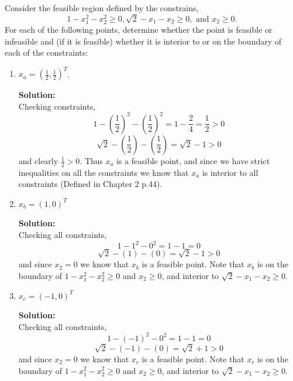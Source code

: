 \documentclass[12pt]{article}
\makeatletter
\theoremstyle{homework}
\newenvironment{exercise}[1]
{\def\@currentlabel{#1}\exercisecore}
{\endexercisecore}
\newcommand{\localhead}[1]{\par\smallskip\noindent\textbf{#1}\nobreak\\}%
\newcommand\solution{\localhead{Solution:}}
\makeatother
\begin{document}
\begin{exercise}{2.1} Consider the feasible region defined by the constrains, 
  \begin{equation*}
    1 - x_1^2 - x_2^2 \geq 0, \sqrt{2} - x_1 - x_2 \geq 0,\text{ and } x_2 \geq 0. 
  \end{equation*}
  For each of the following points, determine whether the point is feasible or infeasible and (if it is feasible)
  whether it is interior to or on the boundary of each of the constraints:
  \begin{enumerate}
    \item $x_a = (\frac{1}{2}, \frac{1}{2})^{T}$.
    \solution Checking constraints, 
    \begin{equation*}
      1 - \left(\frac{1}{2}\right)^2 - \left(\frac{1}{2}\right)^2 = 1 - \frac{2}{4} = \frac{1}{2} > 0
    \end{equation*}
    \begin{equation*}
      \sqrt{2} - (\frac{1}{2}) - (\frac{1}{2}) = \sqrt{2} - 1 > 0
    \end{equation*}
    and clearly $\frac{1}{2} > 0$. Thus $x_a$ is a feasible point, and since we have strict inequalities
    on all the constraints we know that $x_a$ is interior to all constraints (Defined in Chapter 2 p.44). 
    
    \item $x_b = (1,0)^T$
    \solution Checking all constraints, 
    \begin{equation*}
      1 - 1^2 - 0^2 = 1 - 1 =  0
    \end{equation*}
    \begin{equation*}
      \sqrt{2} - (1) - (0) = \sqrt{2} - 1 > 0
    \end{equation*}
    and since $x_2 = 0$ we know that $x_b$ is a feasible point. Note that $x_b$ is on the boundary of 
    $1 - x_1^2 - x_2^2 \geq 0$ and $x_2 \geq 0$, and interior to $\sqrt{2} - x_1 - x_2 \geq 0$.


    \item $x_c = (-1, 0)^T$
    \solution Checking all constraints, 
    \begin{equation*}
      1 - (-1)^2 - 0^2 = 1 - 1 =  0
    \end{equation*}
    \begin{equation*}
      \sqrt{2} - (-1) - (0) = \sqrt{2} + 1 > 0
    \end{equation*}
    and since $x_2 = 0$ we know that $x_c$ is a feasible point. Note that $x_c$ is on the boundary of 
    $1 - x_1^2 - x_2^2 \geq 0$ and $x_2 \geq 0$, and interior to $\sqrt{2} - x_1 - x_2 \geq 0$.


\end{enumerate}
\end{exercise}
\end{document}
